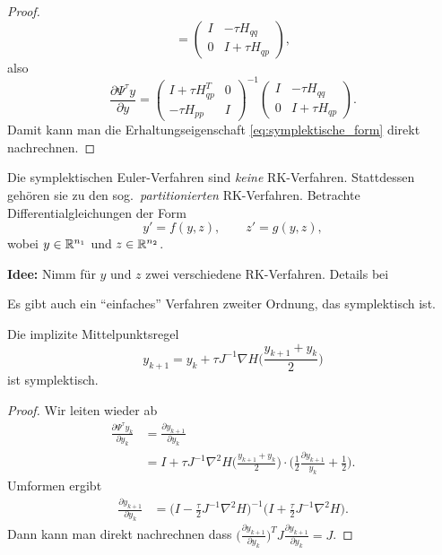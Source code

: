 \begin{proof}
\begin{equation*}
	=
	\begin{pmatrix}
	I & -\tau H_{qq} \\ 0 & I+\tau H_{qp}
	\end{pmatrix},
	\end{equation*}
	also
	\begin{equation*}
	\frac{\partial \Psi^\tau y}{\partial y} = \begin{pmatrix}
	I + \tau H_{qp}^T & 0 \\ -\tau H_{pp} & I
	\end{pmatrix}^{-1} \begin{pmatrix}
	I & -\tau H_{qq} \\ 0 & I+\tau H_{qp}
	\end{pmatrix}.
	\end{equation*}
	Damit kann man die Erhaltungseigenschaft \eqref{eq:symplektische_form} direkt nachrechnen.
\end{proof}

Die symplektischen Euler-Verfahren sind \emph{keine} RK-Verfahren. 
Stattdessen gehören sie zu den sog.\ \emph{partitionierten} RK-Verfahren.
Betrachte Differentialgleichungen der Form
\begin{equation*}
	y'=f(y,z),\qquad z'=g(y,z),
\end{equation*}
wobei $y\in\mathbb R^{n_1}$ und $z\in\mathbb R^{n_2}$. 

\textbf{Idee:} Nimm für $y$ und $z$ zwei verschiedene RK-Verfahren.
Details bei \cite[Kapitel II.2]{hairer_lubich_wanner:2006}

Es gibt auch ein \enquote{einfaches} Verfahren zweiter Ordnung, das symplektisch ist.
\begin{satz}
	Die implizite Mittelpunktsregel
	\begin{equation*}
		y_{k+1} = y_k + \tau J^{-1}\nabla H\Big( \frac{y_{k+1}+y_k}{2}\Big)
	\end{equation*}
	ist symplektisch.
\end{satz}
\begin{proof}
	Wir leiten wieder ab
	\begin{align*}
		\frac{\partial \Psi^\tau y_k}{\partial y_k} &= \frac{\partial y_{k+1}}{\partial y_k} \\
		&= I + \tau J^{-1} \nabla^2 H\Big( \frac{y_{k+1} + y_k}{2} \Big) \cdot \Big( \frac{1}{2} \frac{\partial y_{k+1}}{y_k} + \frac{1}{2}\Big).
	\end{align*}
	Umformen ergibt
	\begin{align*}
		\frac{\partial y_{k+1}}{\partial y_k}
		&= \Big( I - \frac{\tau}{2} J^{-1}\nabla^2H\Big)^{-1}\Big(I+\frac{\tau}{2}J^{-1}\nabla^2 H\Big).
	\end{align*}
	Dann kann man direkt nachrechnen dass
	$\Big(\frac{\partial y_{k+1}}{\partial y_k}\Big)^T J \frac{\partial y_{k+1}}{\partial y_k} = J$.

\end{proof}


